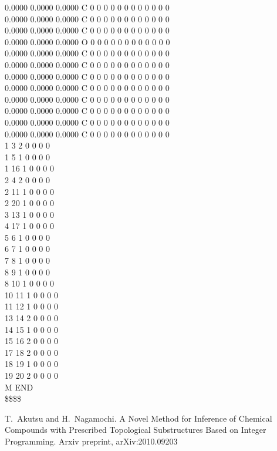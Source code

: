 \documentclass[11pt,titlepage,dvipdfmx,twoside]{article}
\begin{document}
\begin{oframed}
{    0.0000    0.0000    0.0000  C  0  0  0  0  0  0  0  0  0  0  0  0 \\
    0.0000    0.0000    0.0000  C  0  0  0  0  0  0  0  0  0  0  0  0 \\
    0.0000    0.0000    0.0000  C  0  0  0  0  0  0  0  0  0  0  0  0 \\
    0.0000    0.0000    0.0000  O  0  0  0  0  0  0  0  0  0  0  0  0 \\
    0.0000    0.0000    0.0000  C  0  0  0  0  0  0  0  0  0  0  0  0 \\
    0.0000    0.0000    0.0000  C  0  0  0  0  0  0  0  0  0  0  0  0 \\
    0.0000    0.0000    0.0000  C  0  0  0  0  0  0  0  0  0  0  0  0 \\
    0.0000    0.0000    0.0000  C  0  0  0  0  0  0  0  0  0  0  0  0 \\
    0.0000    0.0000    0.0000  C  0  0  0  0  0  0  0  0  0  0  0  0 \\
    0.0000    0.0000    0.0000  C  0  0  0  0  0  0  0  0  0  0  0  0 \\
    0.0000    0.0000    0.0000  C  0  0  0  0  0  0  0  0  0  0  0  0 \\
    0.0000    0.0000    0.0000  C  0  0  0  0  0  0  0  0  0  0  0  0 \\
  1  3  2  0  0  0  0 \\
  1  5  1  0  0  0  0 \\
  1 16  1  0  0  0  0 \\
  2  4  2  0  0  0  0 \\
  2 11  1  0  0  0  0 \\
  2 20  1  0  0  0  0 \\
  3 13  1  0  0  0  0 \\
  4 17  1  0  0  0  0 \\
  5  6  1  0  0  0  0 \\
  6  7  1  0  0  0  0 \\
  7  8  1  0  0  0  0 \\
  8  9  1  0  0  0  0 \\
  8 10  1  0  0  0  0 \\
 10 11  1  0  0  0  0 \\
 11 12  1  0  0  0  0 \\
 13 14  2  0  0  0  0 \\
 14 15  1  0  0  0  0 \\
 15 16  2  0  0  0  0 \\
 17 18  2  0  0  0  0 \\
 18 19  1  0  0  0  0 \\
 19 20  2  0  0  0  0 \\
M  END \\
\$\$\$\$
}
\end{oframed}

\begin{thebibliography}{10}
	  T.~Akutsu and H.~Nagamochi.
	  A Novel Method for Inference of Chemical Compounds with Prescribed Topological Substructures Based on Integer Programming.
	  Arxiv preprint, arXiv:2010.09203
\end{thebibliography}
\end{document}

